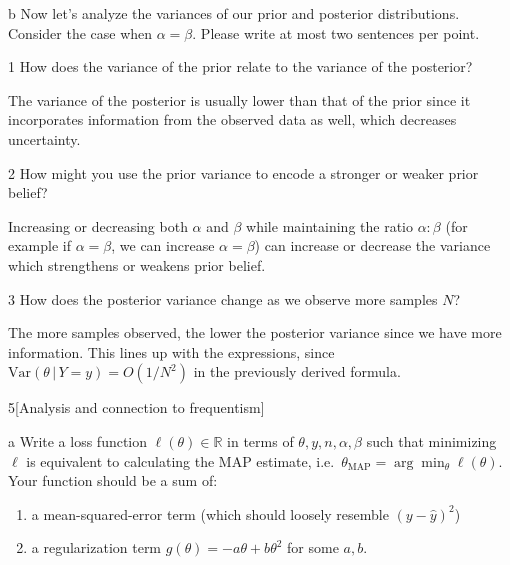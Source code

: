 \documentclass[expanded]{lkx_pset}
\begin{document}
\begin{solution}
\begin{parts}
		\begin{part}{b} Now let's analyze the variances of our prior and posterior distributions. Consider the case when $\alpha = \beta$. Please write at most two sentences per point.
		\end{part}

		\begin{parts}
			\begin{part}{1}
				How does the variance of the prior relate to the variance of the posterior?
			\end{part}
			The variance of the posterior is usually lower than that of the prior since it incorporates information from the observed data as well, which decreases uncertainty.

			\begin{part}{2}
				How might you use the prior variance to encode a stronger or weaker prior belief?
			\end{part}
			Increasing or decreasing both $\alpha$ and $\beta$ while maintaining the ratio $\alpha : \beta$ (for example if $\alpha=\beta$, we can increase $\alpha=\beta$) can increase or decrease the variance which strengthens or weakens prior belief.

			\begin{part}{3}
				How does the posterior variance change as we observe more samples $N$?
			\end{part}
			The more samples observed, the lower the posterior variance since we have more information. This lines up with the expressions, since $\textrm{Var}(\theta\,|\,Y=y)=O(1/N^2)$ in the previously derived formula.
		\end{parts}
	\end{parts}

	\begin{part}{5}[Analysis and connection to frequentism]
	\end{part}

	\begin{parts}
		\begin{part}{a}
			Write a loss function \(\ell(\theta) \in \mathbb{R}\) in terms of
			\(\theta, y, n, \alpha, \beta\) such that minimizing \(\ell\) is
			equivalent to calculating the MAP estimate,
			i.e.~\(\theta_{\text{MAP}} = \arg \min_{\theta} \ell(\theta)\). Your
			function should be a sum of:
			\begin{enumerate}
				\item a mean-squared-error term (which should loosely resemble $(y - \hat y)^2$)
				\item a
				      regularization term \(g(\theta) = - a \theta + b \theta^{2}\) for some $a, b$.
			\end{enumerate}


\end{part}
\end{parts}
\end{solution}
\end{document}
